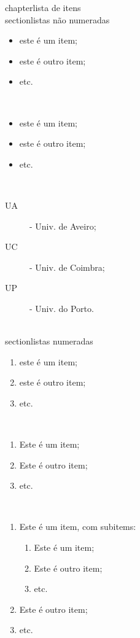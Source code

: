\documentclass[]{report}
\begin{document}
chapter{lista de itens}\\
section{listas não numeradas}\\
\begin{itemize}
\item este é um item;
\item este é outro item;
\item etc.
\end{itemize}\\
\begin{itemize}
\item[+] este é um item;
\item[+] este é outro item;
\item[+] etc.
\end{itemize}\\
\begin{description}
\item[UA] - Univ. de Aveiro;
\item[UC] - Univ. de Coimbra;
\item[UP] - Univ. do Porto.
\end{description}\\
section{listas numeradas}\\
\begin{enumerate}
\item este é um item;
\item este é outro item;
\item etc.
\end{enumerate}\\
\renewcommand{\theenumi}{\Roman{enumi}}
\begin{enumerate}
\item Este é um item;
\item Este é outro item;
\item etc.
\end{enumerate}\\
\renewcommand{\theenumi}{\Roman{enumi}}
\begin{enumerate}
\item Este é um item, com subitems:
\renewcommand{\theenumi}{\alpha{enumi}}
\begin{enumerate}
\item Este é um item;
\item Este é outro item;
\item etc.
\end{enumerate}
\renewcommand{\theenumi}{\Roman{enumi}}
\item Este é outro item;
\item etc.
\end{enumerate}\\
\end{document}
